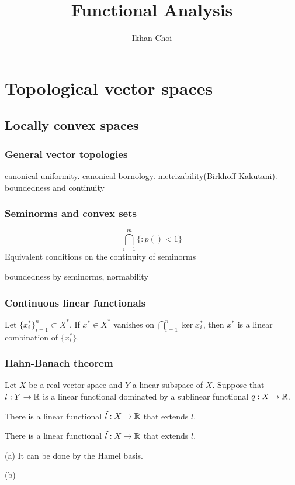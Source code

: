 \documentclass{../note}
\begin{document}
\title{Functional Analysis}
\author{Ikhan Choi}
\maketitle
\tableofcontents

\part{Topological vector spaces}


\chapter{Locally convex spaces}
\section{General vector topologies}
canonical uniformity.
canonical bornology.
metrizability(Birkhoff-Kakutani).
boundedness and continuity

\section{Seminorms and convex sets}
\begin{prb}[Seminorms]
\[\bigcap_{i=1}^m\{:p()<1\}\]
Equivalent conditions on the continuity of seminorms
\end{prb}
\begin{pf}

\end{pf}
boundedness by seminorms, normability

\section{Continuous linear functionals}
\begin{prb}
Let $\{x_i^*\}_{i=1}^n\subset X^*$.
If $x^*\in X^*$ vanishes on $\bigcap_{i=1}^n\ker x_i^*$, then $x^*$ is a linear combination of $\{x_i^*\}$.
\end{prb}



\section{Hahn-Banach theorem}

\begin{prb}
Let $X$ be a real vector space and $Y$ a linear subspace of $X$.
Suppose that $l:Y\to\mathbb{R}$ is a linear functional dominated by a sublinear functional $q:X\to\mathbb{R}$.
\begin{parts}
\item There is a linear functional $\widetilde l:X\to\mathbb{R}$ that extends $l$.
\item There is a linear functional $\widetilde l:X\to\mathbb{R}$ that extends $l$.
\end{parts}
\end{prb}
\begin{pf}
(a)
It can be done by the Hamel basis.

(b)

\end{pf}
\end{document}
